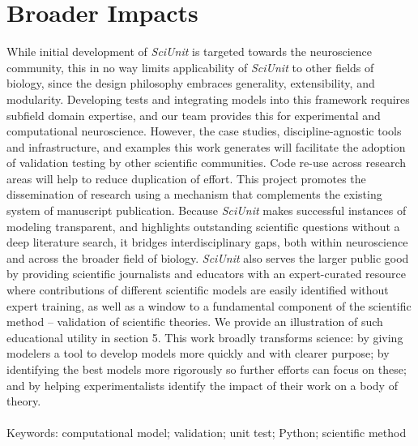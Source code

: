 \documentclass[11pt,letterpaper]{article}
\begin{document}
\section{Broader Impacts}
While initial development of \textit{SciUnit} is targeted towards the neuroscience community, this in no way limits applicability of \textit{SciUnit} to other fields of biology, since the design philosophy embraces generality, extensibility, and modularity. 
Developing tests and integrating models into this framework requires subfield domain expertise, and our team provides this for experimental and computational neuroscience. 
However, the case studies, discipline-agnostic tools and infrastructure, and examples this work generates will facilitate the adoption of validation testing by other scientific communities.  
Code re-use across research areas will help to reduce duplication of effort.  
This project promotes the dissemination of research using a mechanism that complements the existing system of manuscript publication.  
Because \textit{SciUnit} makes successful instances of modeling transparent, and highlights outstanding scientific questions without a deep literature search, it bridges interdisciplinary gaps, both within neuroscience and across the broader field of biology. 
\textit{SciUnit} also serves the larger public good by providing scientific journalists and educators with an expert-curated resource where contributions of different scientific models are easily identified without expert training, as well as a window to a fundamental component of the scientific method – validation of scientific theories.  
We provide an illustration of such educational utility in section 5.  
This work broadly transforms science: by giving modelers a tool to develop models more quickly and with clearer purpose; 
by identifying the best models more rigorously so further efforts can focus on these; and by helping experimentalists identify the impact of their work on a body of theory.
\\
\\Keywords: computational model; validation; unit test; Python; scientific method
\end{document}
